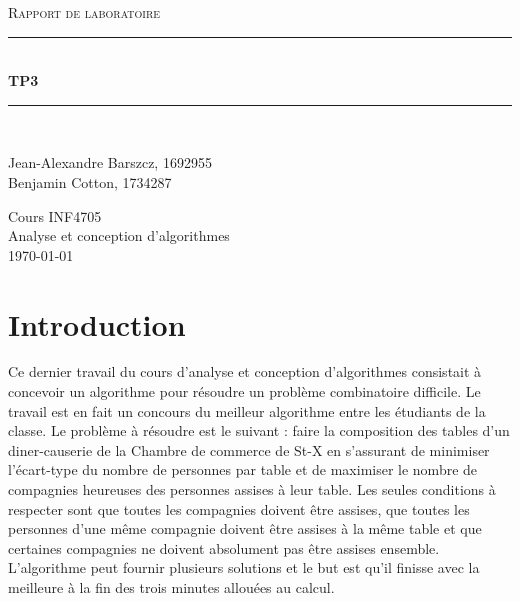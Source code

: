 \documentclass[letterpaper,12pt,final]{article}
\newcommand{\HRule}{\rule{\linewidth}{0.5mm}}
\newcommand{\monTypeDeRapport}{Rapport de laboratoire}
\newcommand{\monTitre}{TP3}
\newcommand{\mesAuteursX}{Jean-Alexandre Barszcz, 1692955 \\ Benjamin Cotton, 1734287}
\newcommand{\monCoursX}{INF4705}
\newcommand{\monCours}{Analyse et conception d’algorithmes}
\begin{document}
    \begin{titlepage}
      \begin{center}

        \begin{doublespace}

          \vspace*{\fill}
          \textsc{ \large \monTypeDeRapport}
          \vspace*{\fill}

          \HRule \\ [5mm]
          {\huge \bfseries \monTitre}\\ [3mm]
          \HRule \\
          \vspace*{\fill}

          \begin{onehalfspace} \large
            \mesAuteursX
          \end{onehalfspace}

          \vfill
          { \Large Cours \monCoursX \\ \monCours } \\

          \today

        \end{doublespace}
      \end{center}
    \end{titlepage}

\newpage

\tableofcontents\newpage

\section{Introduction}

Ce dernier travail du cours d’analyse et conception d’algorithmes
consistait à concevoir un algorithme pour résoudre un problème
combinatoire difficile. Le travail est en fait un concours du meilleur
algorithme entre les étudiants de la classe. Le problème à résoudre
est le suivant : faire la composition des tables d’un diner-causerie
de la Chambre de commerce de St-X en s’assurant de minimiser
l’écart-type du nombre de personnes par table et de maximiser le
nombre de compagnies heureuses des personnes assises à leur table. Les
seules conditions à respecter sont que toutes les compagnies doivent
être assises, que toutes les personnes d’une même compagnie doivent
être assises à la même table et que certaines compagnies ne doivent
absolument pas être assises ensemble.  L'algorithme peut fournir
plusieurs solutions et le but est qu'il finisse avec la meilleure à la
fin des trois minutes allouées au calcul.
\end{document}
